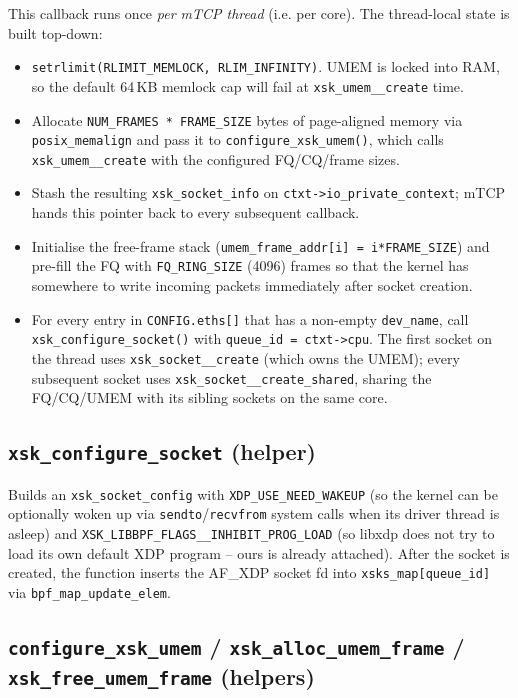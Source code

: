 \documentclass[10pt, letterpaper, twocolumn]{article}
\begin{document}
This callback runs once \textit{per mTCP thread} (i.e. per core). The thread-local state is built top-down:
\begin{itemize}
    \item \texttt{setrlimit(RLIMIT\_MEMLOCK, RLIM\_INFINITY)}. UMEM is locked into RAM, so the default 64\,KB memlock cap will fail at \texttt{xsk\_umem\_\_create} time.
    \item Allocate \texttt{NUM\_FRAMES * FRAME\_SIZE} bytes of page-aligned memory via \texttt{posix\_memalign} and pass it to \texttt{configure\_xsk\_umem()}, which calls \texttt{xsk\_umem\_\_create} with the configured FQ/CQ/frame sizes.
    \item Stash the resulting \texttt{xsk\_socket\_info} on \texttt{ctxt->io\_private\_context}; mTCP hands this pointer back to every subsequent callback.
    \item Initialise the free-frame stack (\texttt{umem\_frame\_addr[i] = i*FRAME\_SIZE}) and pre-fill the FQ with \texttt{FQ\_RING\_SIZE} (4096) frames so that the kernel has somewhere to write incoming packets immediately after socket creation.
    \item For every entry in \texttt{CONFIG.eths[]} that has a non-empty \texttt{dev\_name}, call \texttt{xsk\_configure\_socket()} with \texttt{queue\_id = ctxt->cpu}. The first socket on the thread uses \texttt{xsk\_socket\_\_create} (which owns the UMEM); every subsequent socket uses \texttt{xsk\_socket\_\_create\_shared}, sharing the FQ/CQ/UMEM with its sibling sockets on the same core.
\end{itemize}

\subsection{\texttt{xsk\_configure\_socket} (helper)}

Builds an \texttt{xsk\_socket\_config} with \texttt{XDP\_USE\_NEED\_WAKEUP} (so the kernel can be optionally woken up via \texttt{sendto}/\texttt{recvfrom} system calls when its driver thread is asleep) and \texttt{XSK\_LIBBPF\_FLAGS\_\_INHIBIT\_PROG\_LOAD} (so libxdp does not try to load its own default XDP program -- ours is already attached). After the socket is created, the function inserts the AF\_XDP socket fd into \texttt{xsks\_map[queue\_id]} via \texttt{bpf\_map\_update\_elem}.

\subsection{\texttt{configure\_xsk\_umem} / \texttt{xsk\_alloc\_umem\_frame} / \texttt{xsk\_free\_umem\_frame} (helpers)}
\end{document}
